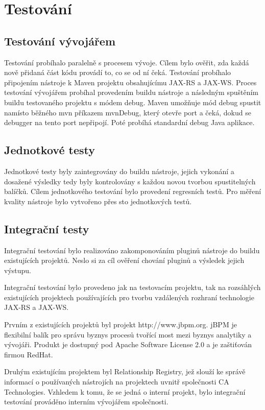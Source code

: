 \documentclass[11pt,twoside,a4paper]{book}
\begin{document}
\chapter{Testování}

\section{Testování vývojářem}

Testování probíhalo paralelně s procesem vývoje. Cílem bylo ověřit, zda každá nově přidaná
část kódu provádí to, co se od ní čeká. Testování probíhalo připojením nástroje k Maven
projektu obsahujícímu JAX-RS a JAX-WS. Proces testování vývojářem probíhal provedením
buildu nástroje a následným spuštěním buildu testovaného projektu s módem debug. Maven
umožňuje mód debug spustit namísto běžného mvn příkazem mvnDebug, který otevře port a
čeká, dokud se debugger na tento port nepřipojí. Poté probíhá standardní debug Java aplikace.

\section{Jednotkové testy}

Jednotkové testy byly zaintegrovány do buildu nástroje, jejich vykonání a dosažené výsledky
tedy byly kontrolovány s každou novou tvorbou spustitelných balíčků. Cílem jednotkového
testování bylo provedení regresních testů. Pro měření kvality nástroje bylo vytvořeno přes sto
jednotkových testů.

\section{Integrační testy}

Integrační testování bylo realizováno zakomponováním pluginů nástroje do buildu
existujících projektů. Neslo si za cíl ověření chování pluginů a výsledek jejich výstupu.

Integrační testování bylo provedeno jak na testovacím projektu, tak na rozsáhlých existujících
projektech používajících pro tvorbu vzdálených rozhraní technologie JAX-RS a JAX-WS.

Prvním z existujících projektů byl projekt http://www.jbpm.org. jBPM je flexibilní balík pro
správu byznys procesů tvořící most mezi byznys analytiky a vývojáři. Produkt je dostupný
pod Apache Software License 2.0 a je zaštiťován firmou RedHat.

Druhým existujícím projektem byl Relationship Registry, jež slouží ke správě informací o
používaných nástrojích na projektech uvnitř společnosti CA Technologies. Vzhledem k tomu,
že se jedná o interní projekt, bylo integrační testování prováděno interním vývojářem
společnosti.
\end{document}
